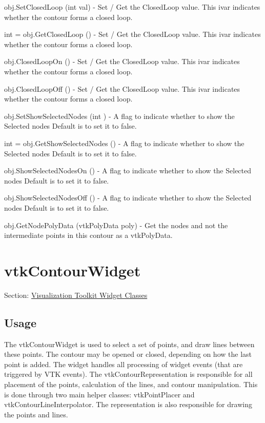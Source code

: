 \begin{DoxyItemize}
\item {\ttfamily obj.\-Set\-Closed\-Loop (int val)} -\/ Set / Get the Closed\-Loop value. This ivar indicates whether the contour forms a closed loop.  
\item {\ttfamily int = obj.\-Get\-Closed\-Loop ()} -\/ Set / Get the Closed\-Loop value. This ivar indicates whether the contour forms a closed loop.  
\item {\ttfamily obj.\-Closed\-Loop\-On ()} -\/ Set / Get the Closed\-Loop value. This ivar indicates whether the contour forms a closed loop.  
\item {\ttfamily obj.\-Closed\-Loop\-Off ()} -\/ Set / Get the Closed\-Loop value. This ivar indicates whether the contour forms a closed loop.  
\item {\ttfamily obj.\-Set\-Show\-Selected\-Nodes (int )} -\/ A flag to indicate whether to show the Selected nodes Default is to set it to false.  
\item {\ttfamily int = obj.\-Get\-Show\-Selected\-Nodes ()} -\/ A flag to indicate whether to show the Selected nodes Default is to set it to false.  
\item {\ttfamily obj.\-Show\-Selected\-Nodes\-On ()} -\/ A flag to indicate whether to show the Selected nodes Default is to set it to false.  
\item {\ttfamily obj.\-Show\-Selected\-Nodes\-Off ()} -\/ A flag to indicate whether to show the Selected nodes Default is to set it to false.  
\item {\ttfamily obj.\-Get\-Node\-Poly\-Data (vtk\-Poly\-Data poly)} -\/ Get the nodes and not the intermediate points in this contour as a vtk\-Poly\-Data.  
\end{DoxyItemize}\hypertarget{vtkwidgets_vtkcontourwidget}{}\section{vtk\-Contour\-Widget}\label{vtkwidgets_vtkcontourwidget}
Section\-: \hyperlink{sec_vtkwidgets}{Visualization Toolkit Widget Classes} \hypertarget{vtkwidgets_vtkxyplotwidget_Usage}{}\subsection{Usage}\label{vtkwidgets_vtkxyplotwidget_Usage}
The vtk\-Contour\-Widget is used to select a set of points, and draw lines between these points. The contour may be opened or closed, depending on how the last point is added. The widget handles all processing of widget events (that are triggered by V\-T\-K events). The vtk\-Contour\-Representation is responsible for all placement of the points, calculation of the lines, and contour manipulation. This is done through two main helper classes\-: vtk\-Point\-Placer and vtk\-Contour\-Line\-Interpolator. The representation is also responsible for drawing the points and lines.

